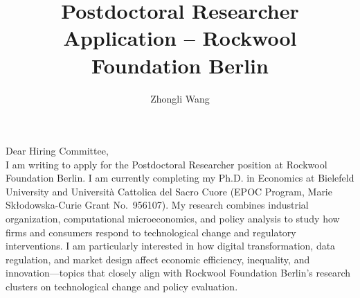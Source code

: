 \documentclass{nfr}
\title{Postdoctoral Researcher Application – Rockwool Foundation Berlin}
\author{Zhongli Wang}
\begin{document}

% 
% 
% 
% 


\maketitle


\noindent Dear Hiring Committee,\\[0.2cm]

I am writing to apply for the Postdoctoral Researcher position at Rockwool Foundation Berlin. 
I am currently completing my Ph.D. in Economics at Bielefeld University and Università Cattolica del Sacro Cuore (EPOC Program, Marie Skłodowska-Curie Grant No.~956107). 
My research combines industrial organization, computational microeconomics, and policy analysis to study how firms and consumers respond to technological change and regulatory interventions. 
I am particularly interested in how digital transformation, data regulation, and market design affect economic efficiency, inequality, and innovation—topics that closely align with Rockwool Foundation Berlin’s research clusters on technological change and policy evaluation.\\
\end{document}
